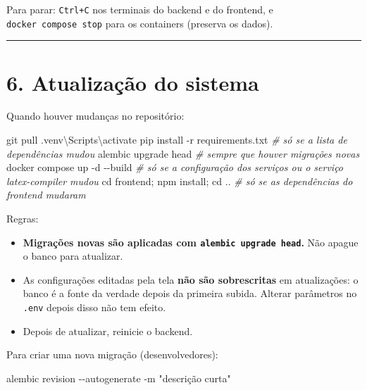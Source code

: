 \documentclass[
  brazilian,
  a4paper,12pt,oneside]{report}
\newenvironment{Shaded}{}{}
\newcommand{\CommentTok}[1]{\textcolor[rgb]{0.38,0.63,0.69}{\textit{#1}}}
\newcommand{\FunctionTok}[1]{\textcolor[rgb]{0.02,0.16,0.49}{#1}}
\newcommand{\NormalTok}[1]{#1}
\newcommand{\OperatorTok}[1]{\textcolor[rgb]{0.40,0.40,0.40}{#1}}
\newcommand{\StringTok}[1]{\textcolor[rgb]{0.25,0.44,0.63}{#1}}
\providecommand{\tightlist}{%
  \setlength{\itemsep}{0pt}\setlength{\parskip}{0pt}}
\begin{document}
Para parar: \texttt{Ctrl+C} nos terminais do backend e do frontend, e
\texttt{docker\ compose\ stop} para os containers (preserva os dados).

\begin{center}\rule{0.5\linewidth}{0.5pt}\end{center}

\chapter{6. Atualização do sistema}\label{atualizauxe7uxe3o-do-sistema}

Quando houver mudanças no repositório:

\begin{Shaded}
\begin{Highlighting}[]
\NormalTok{git pull}
\OperatorTok{.}\FunctionTok{venv}\NormalTok{\textbackslash{}Scripts\textbackslash{}activate}
\NormalTok{pip install }\OperatorTok{{-}}\NormalTok{r requirements}\OperatorTok{.}\FunctionTok{txt}          \CommentTok{\# só se a lista de dependências mudou}
\NormalTok{alembic upgrade head                     }\CommentTok{\# sempre que houver migrações novas}
\NormalTok{docker compose up }\OperatorTok{{-}}\NormalTok{d }\OperatorTok{{-}{-}}\NormalTok{build             }\CommentTok{\# só se a configuração dos serviços ou o serviço latex{-}compiler mudou}
\FunctionTok{cd}\NormalTok{ frontend}\OperatorTok{;}\NormalTok{ npm install}\OperatorTok{;} \FunctionTok{cd} \OperatorTok{..}          \CommentTok{\# só se as dependências do frontend mudaram}
\end{Highlighting}
\end{Shaded}

Regras:

\begin{itemize}
\tightlist
\item
  \textbf{Migrações novas são aplicadas com
  \texttt{alembic\ upgrade\ head}.} Não apague o banco para atualizar.
\item
  As configurações editadas pela tela \textbf{não são sobrescritas} em
  atualizações: o banco é a fonte da verdade depois da primeira subida.
  Alterar parâmetros no \texttt{.}\allowbreak{}\texttt{env} depois disso
  não tem efeito.
\item
  Depois de atualizar, reinicie o backend.
\end{itemize}

Para criar uma nova migração (desenvolvedores):

\begin{Shaded}
\begin{Highlighting}[]
\NormalTok{alembic revision }\OperatorTok{{-}{-}}\NormalTok{autogenerate }\OperatorTok{{-}}\NormalTok{m }\StringTok{"descrição curta"}
\end{Highlighting}
\end{Shaded}
\end{document}

